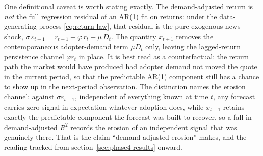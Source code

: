 \documentclass[12pt]{article}
\begin{document}
One definitional caveat is worth stating exactly. The demand-adjusted return is \emph{not} the full regression residual of an AR(1) fit on returns: under the data-generating process \eqref{eq:return-law}, that residual is the pure exogenous news shock, $\sigma\, \varepsilon_{t+1} = r_{t+1} - \varphi\, r_t - \mu\, D_t$. The quantity $x_{t+1}$ removes the contemporaneous adopter-demand term $\mu D_t$ only, leaving the lagged-return persistence channel $\varphi r_t$ in place. It is best read as a counterfactual: the return path the market would have produced had adopter demand not moved the quote in the current period, so that the predictable AR(1) component still has a chance to show up in the next-period observation. %
The distinction names the erosion channel: against $\sigma\varepsilon_{t+1}$, independent of everything known at time $t$, any forecast carries zero signal in expectation whatever adoption does, while $x_{t+1}$ retains exactly the predictable component the forecast was built to recover, so a fall in demand-adjusted $R^{2}$ records the erosion of an independent signal that was genuinely there. That is the claim ``demand-adjusted erosion'' makes, and the reading tracked from section~\ref{sec:phase4-results} onward. %
\end{document}
